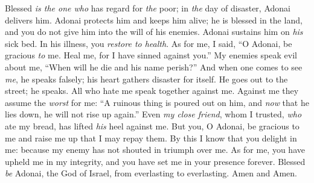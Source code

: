 \begin{biblechapter} %
 Blessed \textit{is the one who} has regard for \textit{the} poor; 
in \textit{the} day of disaster, Adonai delivers him.
\verse Adonai protects him and keeps him alive; 
he is blessed in the land, 
and you do not give him 
into the will of his enemies.
\verse Adonai sustains him on \textit{his} sick bed. 
In his illness, you \textit{restore to health}.
\verse As for me, I said, “O Adonai, be gracious \textit{to} me. 
Heal me, for I have sinned against you.”
\verse My enemies speak evil about me, 
“When will he die and his name perish?”
\verse And when one comes to see \textit{me}, he speaks falsely; 
his heart gathers disaster for itself. 
He goes out to the street; he speaks.
\verse All who hate me speak together against me. 
Against me they assume the \textit{worst} for me:
\verse “A ruinous thing is poured out on him, 
and \textit{now} that he lies down, he will not rise up again.”
\verse Even \textit{my close friend}, whom I trusted, 
\textit{who} ate my bread, 
has lifted \textit{his} heel against me.
\verse But you, O Adonai, be gracious to me and raise me up 
that I may repay them.
\verse By this I know that you delight in me: 
because my enemy has not shouted in triumph over me.
\verse As for me, you have upheld me in my integrity, 
and you have set me in your presence forever.
\verse Blessed \textit{be} Adonai, the God of Israel, 
from everlasting to everlasting. 
Amen and Amen.
\end{biblechapter}

